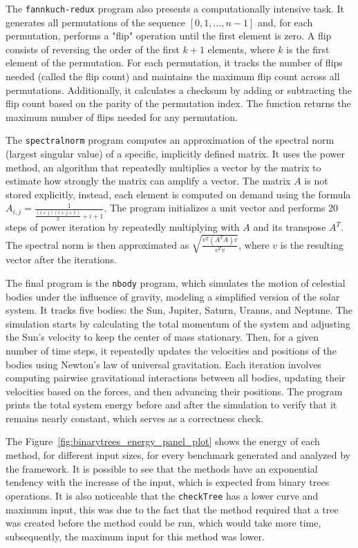 {\color{blue}The \texttt{fannkuch-redux} program also presents a computationally intensive task. It generates all permutations of the sequence \([0, 1, \ldots, n-1]\) and, for each permutation, performs a "flip" operation until the first element is zero. A flip consists of reversing the order of the first \(k + 1\) elements, where \(k\) is the first element of the permutation. For each permutation, it tracks the number of flips needed (called the flip count) and maintains the maximum flip count across all permutations. Additionally, it calculates a checksum by adding or subtracting the flip count based on the parity of the permutation index. The function returns the maximum number of flips needed for any permutation.

The \texttt{spectralnorm} program computes an approximation of the spectral norm (largest singular value) of a specific, implicitly defined matrix. It uses the power method, an algorithm that repeatedly multiplies a vector by the matrix to estimate how strongly the matrix can amplify a vector. The matrix \(A\) is not stored explicitly, instead, each element is computed on demand using the formula \(A_{i,j} = \frac{1}{\frac{(i + j)(i + j + 1)}{2} + i + 1}\). The program initializes a unit vector and performs 20 steps of power iteration by repeatedly multiplying with \(A\) and its transpose \(A^T\). The spectral norm is then approximated as \(\sqrt{\frac{v^T (A^T A) v}{v^T v}}\), where \(v\) is the resulting vector after the iterations. 

The final program is the \texttt{nbody} program, which simulates the motion of celestial bodies under the influence of gravity, modeling a simplified version of the solar system. It tracks five bodies: the Sun, Jupiter, Saturn, Uranus, and Neptune. The simulation starts by calculating the total momentum of the system and adjusting the Sun’s velocity to keep the center of mass stationary. Then, for a given number of time steps, it repeatedly updates the velocities and positions of the bodies using Newton’s law of universal gravitation. Each iteration involves computing pairwise gravitational interactions between all bodies, updating their velocities based on the forces, and then advancing their positions. The program prints the total system energy before and after the simulation to verify that it remains nearly constant, which serves as a correctness check. 
}


The Figure~\ref{fig:binarytrees_energy_panel_plot} shows the energy of each method, for different input sizes, for every benchmark generated and analyzed by the framework. It is possible to see that the methods have an exponential tendency with the increase of the input, which is expected from binary trees operations. It is also noticeable that the \texttt{checkTree} has a lower curve and maximum input, this was due to the fact that the method required that a tree was created before the method could be run, which would take more time, subsequently, the maximum input for this method was lower. 

